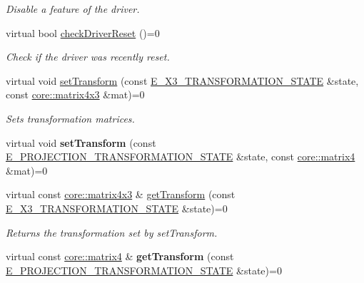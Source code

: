 \begin{DoxyCompactItemize}
\begin{DoxyCompactList}\small\item\em Disable a feature of the driver. \end{DoxyCompactList}\item 
virtual bool \hyperlink{classirr_1_1video_1_1IVideoDriver_a4ba84ee992939fc913d4935caffce87b}{check\+Driver\+Reset} ()=0
\begin{DoxyCompactList}\small\item\em Check if the driver was recently reset. \end{DoxyCompactList}\item 
virtual void \hyperlink{classirr_1_1video_1_1IVideoDriver_a827c428b9f83d07bfb4c6f2a0cb7dd07}{set\+Transform} (const \hyperlink{namespaceirr_1_1video_a9f34b0dd7b888c8cbabb22989f23b853}{E\+\_\+X3\+\_\+\+T\+R\+A\+N\+S\+F\+O\+R\+M\+A\+T\+I\+O\+N\+\_\+\+S\+T\+A\+TE} \&state, const \hyperlink{classirr_1_1core_1_1matrix4x3}{core\+::matrix4x3} \&mat)=0
\begin{DoxyCompactList}\small\item\em Sets transformation matrices. \end{DoxyCompactList}\item 
virtual void {\bfseries set\+Transform} (const \hyperlink{namespaceirr_1_1video_a1336265bc542e3a3855f420565d889b6}{E\+\_\+\+P\+R\+O\+J\+E\+C\+T\+I\+O\+N\+\_\+\+T\+R\+A\+N\+S\+F\+O\+R\+M\+A\+T\+I\+O\+N\+\_\+\+S\+T\+A\+TE} \&state, const \hyperlink{namespaceirr_1_1core_a73fa92e638c5ca97efd72da307cc9b65}{core\+::matrix4} \&mat)=0\hypertarget{classirr_1_1video_1_1IVideoDriver_a0f13f6748f018bec8f2ec5c6a4e7fabe}{}\label{classirr_1_1video_1_1IVideoDriver_a0f13f6748f018bec8f2ec5c6a4e7fabe}

\item 
virtual const \hyperlink{classirr_1_1core_1_1matrix4x3}{core\+::matrix4x3} \& \hyperlink{classirr_1_1video_1_1IVideoDriver_a36c57effe355831805e340a4a1ee69b7}{get\+Transform} (const \hyperlink{namespaceirr_1_1video_a9f34b0dd7b888c8cbabb22989f23b853}{E\+\_\+X3\+\_\+\+T\+R\+A\+N\+S\+F\+O\+R\+M\+A\+T\+I\+O\+N\+\_\+\+S\+T\+A\+TE} \&state)=0
\begin{DoxyCompactList}\small\item\em Returns the transformation set by set\+Transform. \end{DoxyCompactList}\item 
virtual const \hyperlink{namespaceirr_1_1core_a73fa92e638c5ca97efd72da307cc9b65}{core\+::matrix4} \& {\bfseries get\+Transform} (const \hyperlink{namespaceirr_1_1video_a1336265bc542e3a3855f420565d889b6}{E\+\_\+\+P\+R\+O\+J\+E\+C\+T\+I\+O\+N\+\_\+\+T\+R\+A\+N\+S\+F\+O\+R\+M\+A\+T\+I\+O\+N\+\_\+\+S\+T\+A\+TE} \&state)=0\hypertarget{classirr_1_1video_1_1IVideoDriver_ad8676494c4eb637d5d978df60c57ab68}{}\label{classirr_1_1video_1_1IVideoDriver_ad8676494c4eb637d5d978df60c57ab68}


\end{DoxyCompactItemize}
